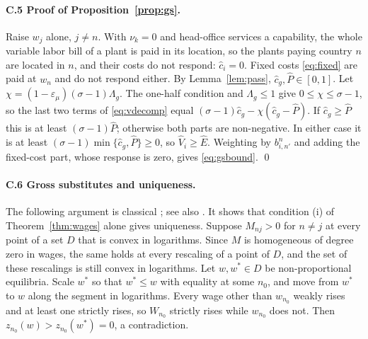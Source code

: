 \documentclass[11pt]{article}
\theoremstyle{definition}
\theoremstyle{remark}
\begin{document}
\paragraph{C.5 Proof of Proposition~\ref{prop:gs}.} Raise $w_j$ alone, $j\neq n$. With
$\nu_k=0$ and head-office services a capability, the whole variable labor bill of a
plant is paid in its location, so the plants paying country $n$ are located in $n$, and
their costs do not respond: $\hat c_i=0$. Fixed costs \eqref{eq:fixed} are paid at
$w_n$ and do not respond either. By Lemma~\ref{lem:pass}, $\hat c_g,\hat P\in[0,1]$. Let
$\chi=(1-\varepsilon_\mu)(\sigma-1)\Lambda_g$. The one-half condition and
$\Lambda_g\le1$ give $0\le\chi\le\sigma-1$, so the last two terms of
\eqref{eq:vdecomp} equal $(\sigma-1)\hat c_g-\chi(\hat c_g-\hat P)$. If $\hat c_g\ge\hat
P$ this is at least $(\sigma-1)\hat P$; otherwise both parts are non-negative. In either
case it is at least $(\sigma-1)\min\{\hat c_g,\hat P\}\ge0$, so $\hat V_i\ge\hat E$.
Weighting by $b^n_{i,n'}$ and adding the fixed-cost part, whose response is zero,
gives \eqref{eq:gsbound}. \qed

\paragraph{C.6 Gross substitutes and uniqueness.} The following argument is classical
\citep{ArrowBlockHurwicz1959}; see also \citet[Section 17.F]{MWG1995}. It shows that condition (i) of Theorem~\ref{thm:wages} alone gives uniqueness. Suppose
$M_{nj}>0$ for $n\neq j$ at every point of a set $D$ that is convex in logarithms.
Since $M$ is homogeneous of degree zero in wages, the same holds at every rescaling of a
point of $D$, and the set of these rescalings is still convex in logarithms. Let
$w,w^*\in D$ be non-proportional equilibria. Scale $w^*$ so that $w^*\le w$ with
equality at some $n_0$, and move from $w^*$ to $w$ along the segment in logarithms.
Every wage other than $w_{n_0}$ weakly rises and at least one strictly rises, so
$W_{n_0}$ strictly rises while $w_{n_0}$ does not. Then
$z_{n_0}(w)>z_{n_0}(w^*)=0$, a contradiction.
\end{document}
